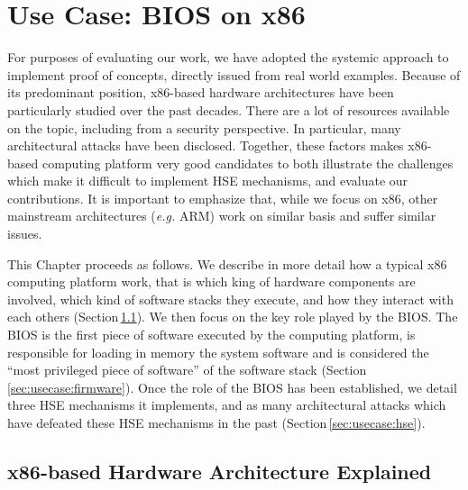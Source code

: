 \chapter{Use Case: BIOS on x86}
\label{chapter:usecase}


For purposes of evaluating our work, we have adopted the systemic approach to
implement proof of concepts, directly issued from real world examples.
%
Because of its predominant position, x86-based hardware architectures have been
particularly studied over the past decades.
%
There are a lot of resources available on the topic, including from a security
perspective.
%
In particular, many architectural attacks have been disclosed.
%
Together, these factors makes x86-based computing platform very good candidates
to both illustrate the challenges which make it difficult to implement HSE
mechanisms, and evaluate our contributions.
%
It is important to emphasize that, while we focus on x86, other mainstream
architectures (\emph{e.g.} ARM) work on similar basis and suffer similar issues.

This Chapter proceeds as follows.
%
We describe in more detail how a typical x86 computing platform work, that is
which king of hardware components are involved, which kind of software stacks
they execute, and how they interact with each others
(Section\,\ref{sec:usecase:architecture}).
%
We then focus on the key role played by the BIOS.
%
The BIOS is the first piece of software executed by the computing platform, is
responsible for loading in memory the system software and is considered the
``most privileged piece of software'' of the software stack
(Section\,\ref{sec:usecase:firmware}).
%
Once the role of the BIOS has been established, we detail three HSE mechanisms
it implements, and as many architectural attacks which have defeated these HSE
mechanisms in the past (Section\,\ref{sec:usecase:hse}).

\section{x86-based Hardware Architecture Explained}
\label{sec:usecase:architecture}

